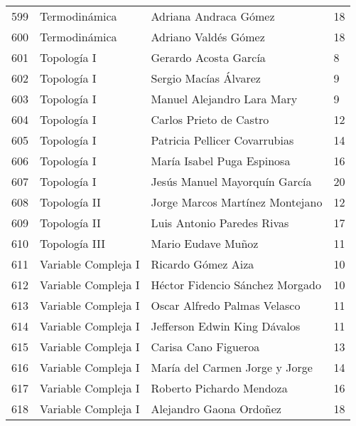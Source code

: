 \begin{table}[ht]
\begin{tabular}{rlll}
  599 & Termodinámica & Adriana Andraca Gómez & 18 \\ 
  600 & Termodinámica & Adriano Valdés Gómez & 18 \\ 
  601 & Topología I & Gerardo Acosta García & 8 \\ 
  602 & Topología I & Sergio Macías Álvarez & 9 \\ 
  603 & Topología I & Manuel Alejandro Lara Mary & 9 \\ 
  604 & Topología I & Carlos Prieto de Castro & 12 \\ 
  605 & Topología I & Patricia Pellicer Covarrubias & 14 \\ 
  606 & Topología I & María Isabel Puga Espinosa & 16 \\ 
  607 & Topología I & Jesús Manuel Mayorquín García & 20 \\ 
  608 & Topología II & Jorge Marcos Martínez Montejano & 12 \\ 
  609 & Topología II & Luis Antonio Paredes Rivas & 17 \\ 
  610 & Topología III & Mario Eudave Muñoz & 11 \\ 
  611 & Variable Compleja I & Ricardo Gómez Aiza & 10 \\ 
  612 & Variable Compleja I & Héctor Fidencio Sánchez Morgado & 10 \\ 
  613 & Variable Compleja I & Oscar Alfredo Palmas Velasco & 11 \\ 
  614 & Variable Compleja I & Jefferson Edwin King Dávalos & 11 \\ 
  615 & Variable Compleja I & Carisa Cano Figueroa & 13 \\ 
  616 & Variable Compleja I & María del Carmen Jorge y Jorge & 14 \\ 
  617 & Variable Compleja I & Roberto Pichardo Mendoza & 16 \\ 
  618 & Variable Compleja I & Alejandro Gaona Ordoñez & 18 \\ 
   \hline
\end{tabular}
\end{table}




